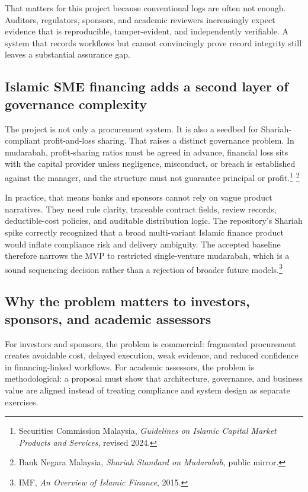 \documentclass[11pt,a4paper]{article}
\begin{document}
That matters for this project because conventional logs are often not enough. Auditors, regulators, sponsors, and academic reviewers increasingly expect evidence that is reproducible, tamper-evident, and independently verifiable. A system that records workflows but cannot convincingly prove record integrity still leaves a substantial assurance gap.

\subsection{Islamic SME financing adds a second layer of governance complexity}

The project is not only a procurement system. It is also a seedbed for Shariah-compliant profit-and-loss sharing. That raises a distinct governance problem. In mudarabah, profit-sharing ratios must be agreed in advance, financial loss sits with the capital provider unless negligence, misconduct, or breach is established against the manager, and the structure must not guarantee principal or profit.\footnote{Securities Commission Malaysia, \emph{Guidelines on Islamic Capital Market Products and Services}, revised 2024.} \footnote{Bank Negara Malaysia, \emph{Shariah Standard on Mudarabah}, public mirror.}

In practice, that means banks and sponsors cannot rely on vague product narratives. They need rule clarity, traceable contract fields, review records, deductible-cost policies, and auditable distribution logic. The repository's Shariah spike correctly recognized that a broad multi-variant Islamic finance product would inflate compliance risk and delivery ambiguity. The accepted baseline therefore narrows the MVP to restricted single-venture mudarabah, which is a sound sequencing decision rather than a rejection of broader future models.\footnote{IMF, \emph{An Overview of Islamic Finance}, 2015.}

\subsection{Why the problem matters to investors, sponsors, and academic assessors}

For investors and sponsors, the problem is commercial: fragmented procurement creates avoidable cost, delayed execution, weak evidence, and reduced confidence in financing-linked workflows. For academic assessors, the problem is methodological: a proposal must show that architecture, governance, and business value are aligned instead of treating compliance and system design as separate exercises.
\end{document}
